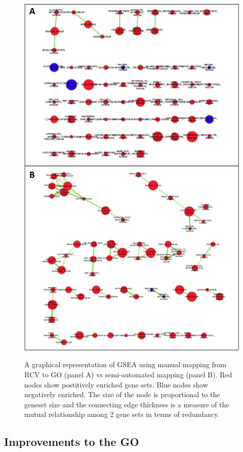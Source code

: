 \documentclass[runningheads,a4paper]{llncs}
\begin{document}
{%
\begin{figure}
\centering
\caption{A graphical representation of GSEA using manual mapping from RCV to GO (panel A) vs semi-automated mapping (panel B).  Red nodes show postitively enriched gene sets.  Blue nodes show negatively enriched. The size of the node is proportional to the geneset size and the connecting edge thickness is a measure of the mutual relationship among 2 gene sets in terms of redundancy.}
\includegraphics[width=120mm]{GSEA.png}
\label{fig:GSEA}
\end{figure}


\subsection{Improvements to the GO}

}
\end{document}
